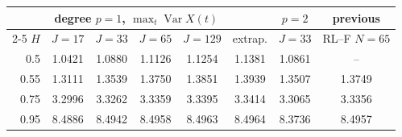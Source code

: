 \begin{tabular}{rccccccc}\toprule
 & \multicolumn{4}{c}{degree $p=1$, $\max_t\operatorname{Var}X(t)$} & & $p=2$ & previous \\\cmidrule(lr){2-5}
$H$ & $J=17$ & $J=33$ & $J=65$ & $J=129$ & extrap. & $J=33$ & RL--F $N=65$ \\\midrule
0.5 & 1.0421 & 1.0880 & 1.1126 & 1.1254 & 1.1381 & 1.0861 & -- \\
0.55 & 1.3111 & 1.3539 & 1.3750 & 1.3851 & 1.3939 & 1.3507 & 1.3749 \\
0.75 & 3.2996 & 3.3262 & 3.3359 & 3.3395 & 3.3414 & 3.3065 & 3.3356 \\
0.95 & 8.4886 & 8.4942 & 8.4958 & 8.4963 & 8.4964 & 8.3736 & 8.4957 \\
\bottomrule\end{tabular}